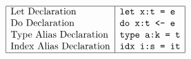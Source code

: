 $$
\begin{array}{|l|l|}
\hline
\text{Let Declaration} & \texttt{let x:t = e}\\
\text{Do Declaration} & \texttt{do x:t <- e}\\
\text{Type Alias Declaration} & \texttt{type a:k = t}\\
\text{Index Alias Declaration} & \texttt{idx i:s = it}\\
\hline
\end{array}
$$